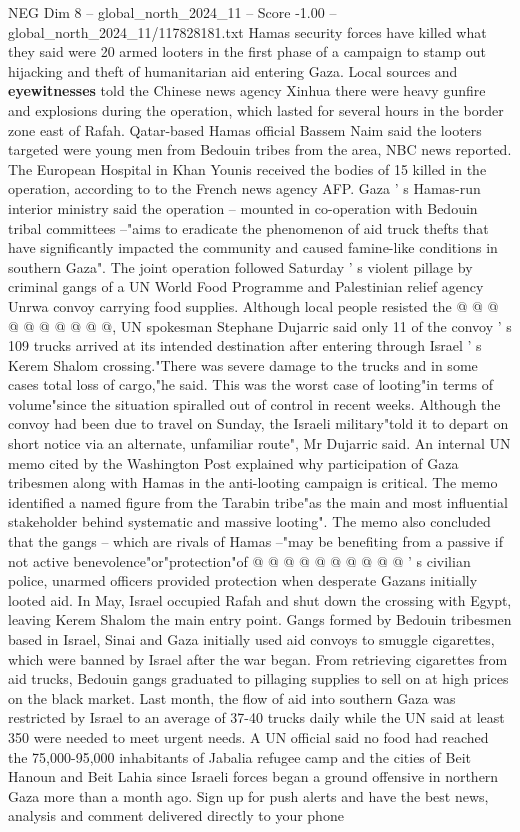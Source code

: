 \begin{textsample}{NEG Dim 8 – global\_north\_2024\_11 – Score -1.00 – global\_north\_2024\_11/117828181.txt}  \label{ex:f8_neg_307}
Hamas security forces have killed what they said were 20 armed looters in the first phase of a campaign to stamp out hijacking and theft of humanitarian aid entering Gaza.
Local sources and \textbf{eyewitnesses} told the Chinese news agency Xinhua there were heavy gunfire and explosions during the operation, which lasted for several hours in the border zone east of Rafah.
Qatar-based Hamas official Bassem Naim said the looters targeted were young men from Bedouin tribes from the area, NBC news reported.
The European Hospital in Khan Younis received the bodies of 15 killed in the operation, according to to the French news agency AFP.
Gaza ' s Hamas-run interior ministry said the operation -- mounted in co-operation with Bedouin tribal committees --"aims to eradicate the phenomenon of aid truck thefts that have significantly impacted the community and caused famine-like conditions in southern Gaza".
The joint operation followed Saturday ' s violent pillage by criminal gangs of a UN World Food Programme and Palestinian relief agency Unrwa convoy carrying food supplies.
Although local people resisted the @ @ @ @ @ @ @ @ @ @, UN spokesman Stephane Dujarric said only 11 of the convoy ' s 109 trucks arrived at its intended destination after entering through Israel ' s Kerem Shalom crossing."There was severe damage to the trucks and in some cases total loss of cargo,"he said.
This was the worst case of looting"in terms of volume"since the situation spiralled out of control in recent weeks.
Although the convoy had been due to travel on Sunday, the Israeli military"told it to depart on short notice via an alternate, unfamiliar route", Mr Dujarric said.
An internal UN memo cited by the Washington Post explained why participation of Gaza tribesmen along with Hamas in the anti-looting campaign is critical.
The memo identified a named figure from the Tarabin tribe"as the main and most influential stakeholder behind systematic and massive looting".
The memo also concluded that the gangs -- which are rivals of Hamas --"may be benefiting from a passive if not active benevolence"or"protection"of @ @ @ @ @ @ @ @ @ @ ' s civilian police, unarmed officers provided protection when desperate Gazans initially looted aid.
In May, Israel occupied Rafah and shut down the crossing with Egypt, leaving Kerem Shalom the main entry point.
Gangs formed by Bedouin tribesmen based in Israel, Sinai and Gaza initially used aid convoys to smuggle cigarettes, which were banned by Israel after the war began.
From retrieving cigarettes from aid trucks, Bedouin gangs graduated to pillaging supplies to sell on at high prices on the black market.
Last month, the flow of aid into southern Gaza was restricted by Israel to an average of 37-40 trucks daily while the UN said at least 350 were needed to meet urgent needs.
A UN official said no food had reached the 75,000-95,000 inhabitants of Jabalia refugee camp and the cities of Beit Hanoun and Beit Lahia since Israeli forces began a ground offensive in northern Gaza more than a month ago.
Sign up for push alerts and have the best news, analysis and comment delivered directly to your phone

\end{textsample}

